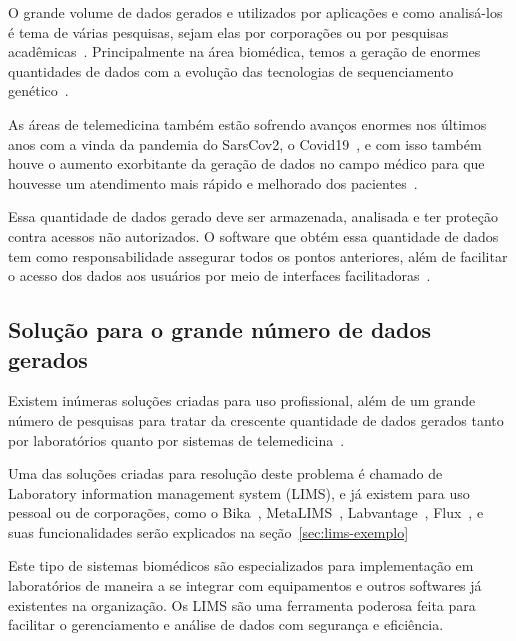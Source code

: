 
O grande volume de dados gerados e utilizados por aplicações e como analisá-los é tema de várias pesquisas, sejam elas por corporações ou por pesquisas acadêmicas~\cite{PhilipChen2014Data-intensiveData}. Principalmente na área biomédica, temos a geração de enormes quantidades de dados com a evolução das tecnologias de sequenciamento genético~\cite{luoJ2016}.

As áreas de telemedicina também estão sofrendo avanços enormes nos últimos anos com a vinda da pandemia do SarsCov2, o Covid19~\cite{bakhtiar2020, kronenfeld2021, GatesB.Colbert2020UtilityEra}, e com isso também houve o aumento exorbitante da geração de dados no campo médico para que houvesse um atendimento mais rápido e melhorado dos pacientes~\cite{MohdKhanapiAbdGhani2018PDFData, Coakley2015TransformingAnalytics}.

Essa quantidade de dados gerado deve ser armazenada, analisada e ter proteção contra acessos não autorizados. O software que obtém essa quantidade de dados tem como responsabilidade assegurar todos os pontos anteriores, além de facilitar o acesso dos dados aos usuários por meio de interfaces facilitadoras~\cite{Nolan1998UnderstandingSystems}.

\subsection{Solução para o grande número de dados gerados}

Existem inúmeras soluções criadas para uso profissional, além de um grande número de pesquisas para tratar da crescente quantidade de dados gerados tanto por laboratórios quanto por sistemas de telemedicina~\cite{Mangrulkar2022AutomaticTechniques}.

Uma das soluções criadas para resolução deste problema é chamado de Laboratory information management system (LIMS), e já existem para uso pessoal ou de corporações, como o Bika~\cite{Goodblatt2006FosteringProcess}, MetaLIMS~\cite{Heinle2017MetaLIMSLabs}, Labvantage~\cite{Smallmon2017BiobankingSilos}, Flux~\cite{Melo2010SIGLa:Laboratories}, e suas funcionalidades serão explicados na seção~\ref{sec:lims-exemplo}

Este tipo de sistemas biomédicos são especializados para implementação em laboratórios de maneira a se integrar com equipamentos e outros softwares já existentes na organização.
Os LIMS são uma ferramenta poderosa feita para facilitar o gerenciamento e análise de dados com segurança e eficiência.



